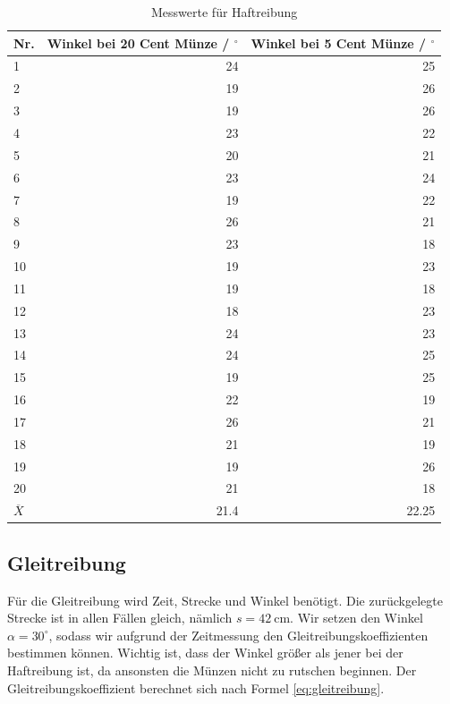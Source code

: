 \documentclass{article}
\begin{document}
\begin{table}[H]
\caption{Messwerte für Haftreibung}
\begin{tabular}{l|rr}
Nr. & \shortstack[l]{Winkel bei\\20 Cent Münze / ${}^\circ$} & \shortstack[l]{Winkel bei\\5 Cent Münze / ${}^\circ$} \\
\hline
1 & 24 & 25 \\
2 & 19 & 26 \\
3 & 19 & 26 \\
4 & 23 & 22 \\
5 & 20 & 21 \\
6 & 23 & 24 \\
7 & 19 & 22 \\
8 & 26 & 21 \\
9 & 23 & 18 \\
10 & 19 & 23 \\
11 & 19 & 18 \\
12 & 18 & 23 \\
13 & 24 & 23 \\
14 & 24 & 25 \\
15 & 19 & 25 \\
16 & 22 & 19 \\
17 & 26 & 21 \\
18 & 21 & 19 \\
19 & 19 & 26 \\
20 & 21 & 18 \\
\hline
$\overline{X}$ & 21.4 & 22.25

\end{tabular}
\end{table}

\newpage

\subsection{Gleitreibung}

Für die Gleitreibung wird Zeit, Strecke und Winkel benötigt. Die zurückgelegte Strecke ist in allen Fällen gleich, nämlich $s=42~$cm. Wir setzen den Winkel $\alpha=30^\circ$, sodass wir aufgrund der Zeitmessung den Gleitreibungskoeffizienten bestimmen können. Wichtig ist, dass der Winkel größer als jener bei der Haftreibung ist, da ansonsten die Münzen nicht zu rutschen beginnen. Der Gleitreibungskoeffizient berechnet sich nach Formel \eqref{eq:gleitreibung}. 
\end{document}
